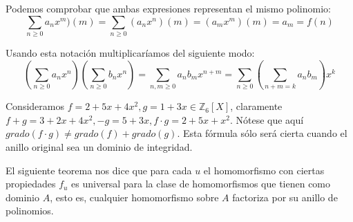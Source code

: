 Podemos comprobar que ambas expresiones representan el mismo polinomio: $$\sum_{n \ge 0} a_n x^m)(m) = \sum_{n \ge 0} (a_n x^n)(m) = (a_mx^m)(m) = a_m = f(n)$$

Usando esta notación multiplicaríamos del siguiente modo: $$(\sum_{n \ge 0} a_n x^n)(\sum_{n \ge 0} b_n x^n) = \sum_{n,m \ge 0} a_n b_m x^{n+m} = \sum_{n \ge 0} (\sum_{n+m = k} a_nb_m) x^k$$ 

\begin{example}
	Consideramos $f = 2+5x+4x^2, g = 1+3x \in \mathbb{Z}_6[X]$, claramente $f+g=3+2x+4x^2, -g = 5+3x,f\cdot g = 2 + 5x + x^2$. Nótese que aquí $grado(f \cdot g) \neq grado(f) + grado(g)$. Esta fórmula sólo será cierta cuando el anillo original sea un dominio de integridad. 
\end{example}

El siguiente teorema nos dice que para cada $u$ el homomorfismo con ciertas propiedades $f_u$ es universal para la clase de homomorfismos que tienen como dominio $A$, esto es, cualquier homomorfismo sobre $A$ factoriza por su anillo de polinomios. 

